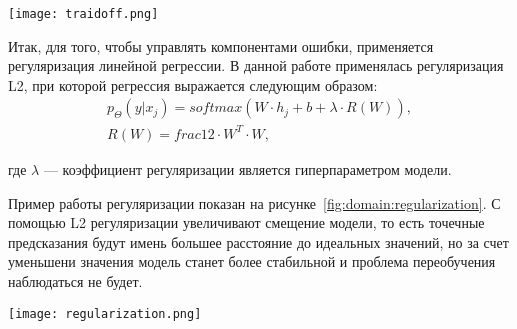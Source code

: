 \begin{center}
  \texttt{[image: traidoff.png]}
  \label{fig:domain:traidoff}
\end{center}

Итак, для того, чтобы управлять компонентами ошибки, применяется регуляризация линейной регрессии. В данной работе применялась регуляризация L2, при которой регрессия выражается следующим образом:
\begin{gather}
  p_{\Theta}(y|x_j) = softmax(W\cdot{h_j} + b + \lambda\cdot{R(W)}),\\
  R(W) = frac{1}{2}\cdot{W^T}\cdot{W},
\end{gather}
\begin{explanationx}
\item[где] $\lambda$ --- коэффициент регуляризации является гиперпараметром модели.
\end{explanationx}

Пример работы регуляризации показан на рисунке~\ref{fig:domain:regularization}. С помощью L2 регуляризации увеличивают смещение модели, то есть точечные предсказания будут имень большее расстояние до идеальных значений, но за счет  уменьшени значения модель станет более стабильной и проблема переобучения наблюдаться не будет.

\begin{center}
  \texttt{[image: regularization.png]}
  \label{fig:domain:regularization}
\end{center}